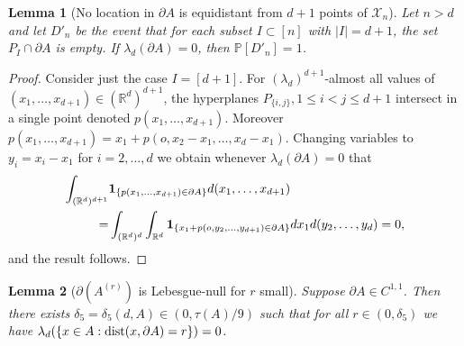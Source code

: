 \documentclass[12pt]{article}
\newcommand{\X}{\mathcal{X}}
\newcommand{\R}{\mathbb{R}}
\newcommand{\dist}{{\rm dist}}
\newtheorem{lemm}{Lemma}
\begin{document}
\begin{lemm}[No location in $\partial A$ is equidistant  from $d+1$
	points of $\X_n$]
	\label{l:dAvtx}
	Let $n > d$ and
let $D'_n$ be the event that for each subset $I \subset [n]$
with $|I| = d+1$, the set $P_I \cap \partial A $ is empty.
	If $\lambda_d(\partial A) = 0$,
then $\mathbb P[D'_n] = 1$.
%
\end{lemm}
\begin{proof} 
	Consider just the case $I= [d+1]$. For $(\lambda_d)^{d+1}$-almost
	all values of $(x_1,\ldots,x_{d+1}) \in (\R^d)^{d+1}$,
	the hyperplanes $P_{\{i,j\}} , 1 \leq i < j \leq d+1 $ intersect in
	a single point denoted $p(x_1,\ldots,x_{d+1})$. Moreover
	$p(x_1,\ldots,x_{d+1} ) = x_1 + p(o,x_2-x_1, \ldots,x_d-x_1)$.
	Changing variables to $y_i = x_i -x_1$ for $i =2,\ldots,d$ we obtain
	whenever $\lambda_d(\partial A) = 0$ that
	\begin{align*}
		\int_{(\R^d)^{d+1}} & {\bf 1}_{\{p(x_1,\ldots,x_{d+1})
		\in \partial A 
		\}}
		d(x_1,\ldots,x_{d+1})
		\\
		= 
		& \int_{(\R^d)^d}
		\int_{\R^d}
		{\bf 1}_{\{x_1 + p(o,y_2,\ldots,y_{d+1}) \in \partial A\}}
		dx_1 d(y_2,\ldots,y_d)
		=0,
	\end{align*}
	and the result follows.
\end{proof} 
\begin{lemm}[$\partial(A^{(r)})$ is Lebesgue-null for $r$ small]
	\label{l:fromHPY}
	Suppose $\partial A \in C^{1,1}$. Then there exists $\delta_5 
	= \delta_5(d,A) \in (0,\tau(A)/9)$ such that for all
	$ r \in (0,\delta_5)$ we have  $\lambda_d(\{x \in A:
	\dist(x,\partial A) = r\}) =0$.
\end{lemm}
\end{document}
